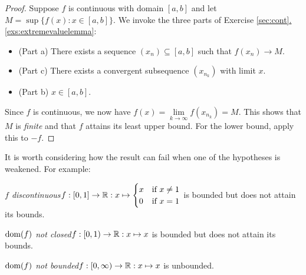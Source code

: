 \begin{proof}
Suppose $f$ is continuous with domain $[a,b]$ and let $M=\sup\{f(x):x\in[a,b]\}$. We invoke the three parts of Exercise \hyperref[exs:extremevaluelemma]{\ref*{sec:cont}.\ref*{exs:extremevaluelemma}}:
\begin{itemize}\itemsep0pt
  \item (Part a) There exists a sequence $(x_n)\subseteq [a,b]$ such that $f(x_n)\to M$.
  \item (Part c) There exists a convergent subsequence $(x_{n_k})$ with limit $x$.
  \item (Part b) $x\in [a,b]$.
\end{itemize}
Since $f$ is continuous, we now have $f(x)=\lim\limits_{k\to\infty}f(x_{n_k})=M$. This shows that $M$ is \emph{finite} and that $f$ attains its least upper bound.
For the lower bound, apply this to $-f$.
\end{proof}

It is worth considering how the result can fail when one of the hypotheses is weakened. For example:
\begin{description}\itemsep0pt
	\item[]\normalfont\emph{$f$ discontinuous}\quad $f:[0,1]\to\mathbb{R}:x\mapsto\begin{cases}
	x&\text{if }x\neq 1\\
	0&\text{if }x=1
	\end{cases}$ is bounded but does not attain its bounds.
	\item[]\normalfont\emph{$\operatorname{dom}(f)$ not closed}\quad $f:[0,1)\to\mathbb{R}:x\mapsto x$ is bounded but does not attain its bounds.
	\item[]\normalfont\emph{$\operatorname{dom}(f)$ not bounded}\quad $f:[0,\infty)\to\mathbb{R}:x\mapsto x$ is unbounded.
\end{description}


\vspace{8pt}


